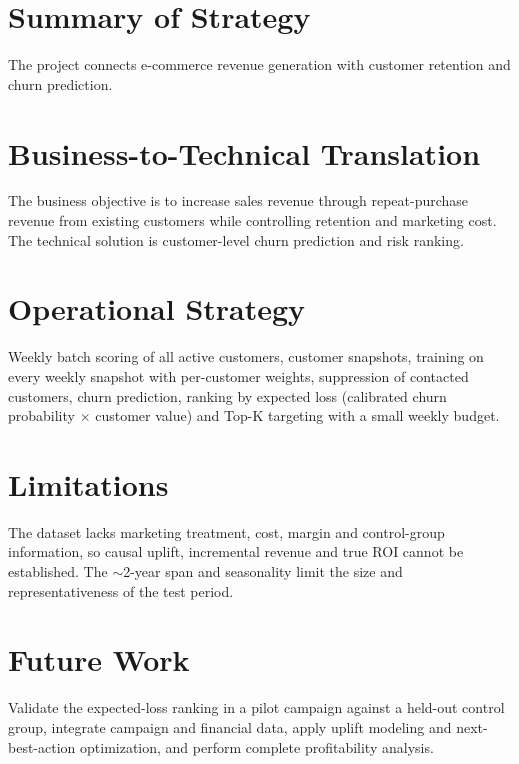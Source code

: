 \section{Summary of Strategy}
\label{sec:10-1}

The project connects e-commerce revenue generation with customer retention and churn prediction.

\section{Business-to-Technical Translation}
\label{sec:10-2}

The business objective is to increase sales revenue through repeat-purchase revenue from existing customers while controlling retention and marketing cost. The technical solution is customer-level churn prediction and risk ranking.

\section{Operational Strategy}
\label{sec:10-3}

Weekly batch scoring of all active customers, customer snapshots, training on every weekly snapshot with per-customer weights, suppression of contacted customers, churn prediction, ranking by expected loss (calibrated churn probability $\times$ customer value) and Top-K targeting with a small weekly budget.

\section{Limitations}
\label{sec:10-4}

The dataset lacks marketing treatment, cost, margin and control-group information, so causal uplift, incremental revenue and true ROI cannot be established. The $\sim$2-year span and seasonality limit the size and representativeness of the test period.

\section{Future Work}
\label{sec:10-5}

Validate the expected-loss ranking in a pilot campaign against a held-out control group, integrate campaign and financial data, apply uplift modeling and next-best-action optimization, and perform complete profitability analysis.
